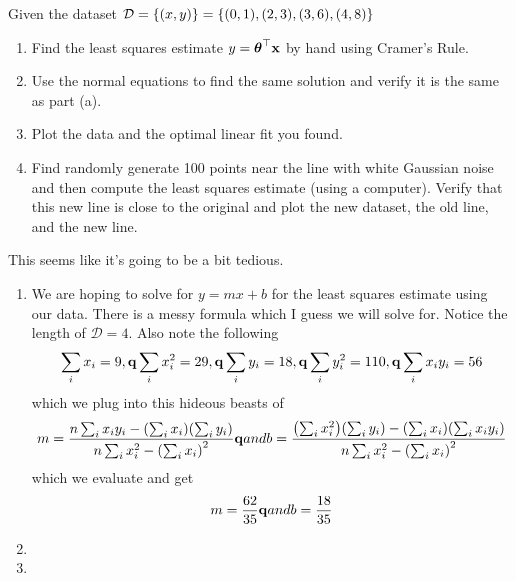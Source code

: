 \documentclass[12pt,letterpaper]{hmcpset}
\begin{document}
\begin{problem}[2]
Given the dataset ${\cal D} = \{(x,y)\} = \{(0,1), (2,3), (3,6), (4,8)\}$
\begin{enumerate}
   \item Find the least squares estimate $y = \hbox{\boldmath$\theta$}^\top{\bf x}$ by hand using
        Cramer's Rule.
    \item Use the normal equations to find the same solution and verify it
        is the same as part (a).
    \item Plot the data and the optimal linear fit you found.
    \item Find randomly generate 100 points near the line with white Gaussian
        noise and then compute the least squares estimate (using a computer).
        Verify that this new line is close to the original and plot the new
        dataset, the old line, and the new line.
\end{enumerate}

\end{problem}
\begin{solution}
    This seems like it's going to be a bit tedious.
    \begin{enumerate}
        \item We are hoping to solve for $y = m x + b$ for the least squares estimate using our data. There is a messy formula which I guess we will solve for. Notice the length of $\mathcal D = 4$. Also note the following 
        \begin{align*}
            \sum_i x_i = 9, {\bf q}{} \sum_i x_i^2 = 29, {\bf q}{} \sum_i y_i = 18, {\bf q}{} \sum_i y_i^2 = 110,  {\bf q}{} \sum_i x_iy_i = 56
        \end{align*}
        which we plug into this hideous beasts of 
        \begin{align*}
            m = \frac{n \sum_i x_iy_i - \qty(\sum_i x_i) \qty(\sum_i y_i) }{n \sum_i x_i^2 - \qty(\sum_i x_i)^2}
            {\bf q}{and}
            b = \frac{\qty(\sum_i x_i^2)\qty(\sum_i y_i) - \qty(\sum_i x_i)\qty(\sum_i x_iy_i)}{n \sum_i x_i^2 - \qty(\sum_i x_i)^2}
        \end{align*}
        which we evaluate and get
        \begin{align*}
            m = \frac{62}{35}
            {\bf q}{and}
            b = \frac{18}{35}
        \end{align*}

        \item

        \item
    \end{enumerate}
\end{solution}
\newpage
\end{document}
